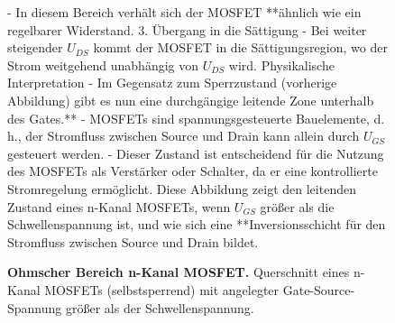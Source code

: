 {\begin{figure}[H]
{            - In diesem Bereich verhält sich der MOSFET **ähnlich wie ein regelbarer Widerstand.
            3. Übergang in die Sättigung
            - Bei weiter steigender \( U_{DS} \) kommt der MOSFET in die Sättigungsregion, wo der Strom weitgehend unabhängig von \( U_{DS} \) wird.
            Physikalische Interpretation
            - Im Gegensatz zum Sperrzustand (vorherige Abbildung) gibt es nun eine durchgängige leitende Zone unterhalb des Gates.**
            - MOSFETs sind spannungsgesteuerte Bauelemente, d. h., der Stromfluss zwischen Source und Drain kann allein durch \( U_{GS} \) gesteuert werden.
            - Dieser Zustand ist entscheidend für die Nutzung des MOSFETs als Verstärker oder Schalter, da er eine kontrollierte Stromregelung ermöglicht.
            Diese Abbildung zeigt den leitenden Zustand eines n-Kanal MOSFETs, wenn \( U_{GS} \) größer als die Schwellenspannung ist, und wie sich eine **Inversionsschicht für den Stromfluss zwischen Source und Drain bildet.}
        \caption{\textbf{Ohmscher Bereich n-Kanal MOSFET.} Querschnitt eines n-Kanal MOSFETs (selbstsperrend) mit angelegter Gate-Source-Spannung größer als der Schwellenspannung.}
        \label{fig:OhmscherBereichN-KanalMOSFET}
    \end{figure}
}

